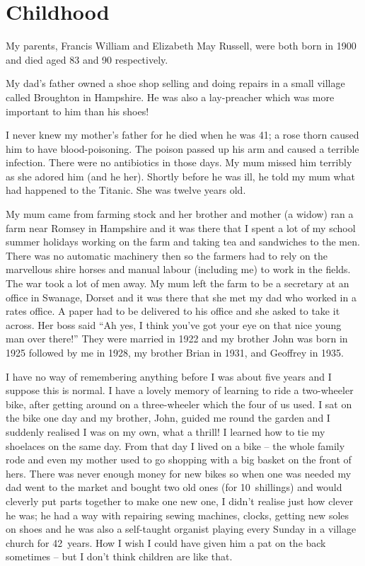 \chapter{Childhood}

My parents, Francis William and Elizabeth May Russell, were both born
in 1900 and died aged 83 and 90 respectively.

My dad's father owned a shoe shop selling and doing repairs in a small
village called Broughton in Hampshire. He was also a lay-preacher
which was more important to him than his shoes!

I never knew my mother's father for he died when he was 41; a rose
thorn caused him to have blood-poisoning. The poison passed up his arm
and caused a terrible infection. There were no antibiotics in those
days. My mum missed him terribly as she adored him (and he
her). Shortly before he was ill, he told my mum what had happened to
the Titanic. She was twelve years old.

My mum came from farming stock and her brother and mother (a widow)
ran a farm near Romsey in Hampshire and it was there that I spent a
lot of my school summer holidays working on the farm and taking tea
and sandwiches to the men. There was no automatic machinery then so
the farmers had to rely on the marvellous shire horses and manual
labour (including me) to work in the fields. The war took a lot of men
away. My mum left the farm to be a secretary at an office in Swanage,
Dorset and it was there that she met my dad who worked in a rates
office. A paper had to be delivered to his office and she asked to
take it across. Her boss said ``Ah yes, I think you've got your eye on
that nice young man over there!'' They were married in 1922 and my
brother John was born in 1925 followed by me in 1928, my brother Brian
in 1931, and Geoffrey in 1935.

I have no way of remembering anything before I was about five years
and I suppose this is normal. I have a lovely memory of learning to
ride a two-wheeler bike, after getting around on a three-wheeler which
the four of us used. I sat on the bike one day and my brother, John,
guided me round the garden and I suddenly realised I was on my own,
what a thrill! I learned how to tie my shoelaces on the same day. From
that day I lived on a bike -- the whole family rode and even my mother
used to go shopping with a big basket on the front of hers. There was
never enough money for new bikes so when one was needed my dad went to
the market and bought two old ones (for 10~shillings) and would
cleverly put parts together to make one new one, I didn’t realise just
how clever he was; he had a way with repairing sewing machines,
clocks, getting new soles on shoes and he was also a self-taught
organist playing every Sunday in a village church for 42~years. How I
wish I could have given him a pat on the back sometimes -- but I don't
think children are like that.


